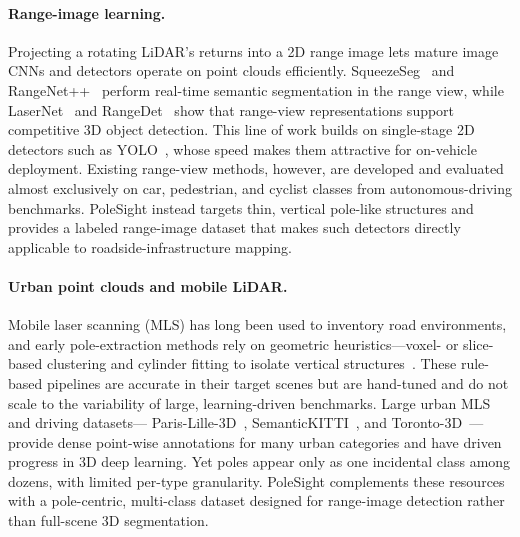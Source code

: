 \paragraph{Range-image learning.}
Projecting a rotating LiDAR's returns into a 2D range image lets mature image
CNNs and detectors operate on point clouds efficiently.
SqueezeSeg~\cite{wu2018squeezeseg} and RangeNet++~\cite{milioto2019rangenet}
perform real-time semantic segmentation in the range view, while
LaserNet~\cite{meyer2019lasernet} and RangeDet~\cite{fan2021rangedet} show
that range-view representations support competitive 3D object detection. This
line of work builds on single-stage 2D detectors such as
YOLO~\cite{redmon2016yolo}, whose speed makes them attractive for on-vehicle
deployment. Existing range-view methods, however, are developed and evaluated
almost exclusively on car, pedestrian, and cyclist classes from
autonomous-driving benchmarks. PoleSight instead targets thin, vertical
pole-like structures and provides a labeled range-image dataset that makes
such detectors directly applicable to roadside-infrastructure mapping.

\paragraph{Urban point clouds and mobile LiDAR.}
Mobile laser scanning (MLS) has long been used to inventory road
environments, and early pole-extraction methods rely on geometric
heuristics---voxel- or slice-based clustering and cylinder fitting to isolate
vertical structures~\cite{lehtomaki2010detection, pu2011recognizing,
cabo2014algorithm}. These rule-based pipelines are accurate in their target
scenes but are hand-tuned and do not scale to the variability of large,
learning-driven benchmarks. Large urban MLS and driving datasets---
Paris-Lille-3D~\cite{roynard2018parislille},
SemanticKITTI~\cite{behley2019semantickitti}, and
Toronto-3D~\cite{tan2020toronto}---provide dense point-wise annotations for
many urban categories and have driven progress in 3D deep learning. Yet poles
appear only as one incidental class among dozens, with limited per-type
granularity. PoleSight complements these resources with a pole-centric,
multi-class dataset designed for range-image detection rather than full-scene
3D segmentation.

